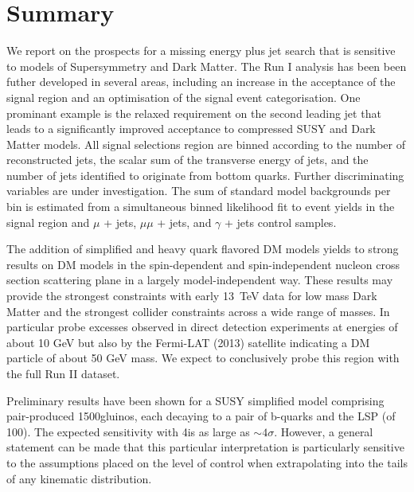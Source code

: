 \section{Summary}
\label{sec:summary}

We report on the prospects for a missing energy plus jet search that
is sensitive to models of Supersymmetry and Dark Matter. 
The Run I analysis has been been futher developed in several areas,
including an increase in the acceptance of the signal region and an
optimisation of the signal event categorisation. One prominant example
is the relaxed requirement on the second leading jet that leads to a
significantly improved acceptance to compressed SUSY and Dark Matter
models.
All signal selections region are binned according to the number of
reconstructed jets, the scalar sum of the transverse energy of jets,
and the number of jets identified to originate from bottom
quarks. Further discriminating variables are under investigation. The
sum of standard model backgrounds per bin is estimated from a
simultaneous binned likelihood fit to event yields in the signal
region and $\mu$ + jets, $\mu\mu$ + jets, and $\gamma$ + jets control
samples.

The addition of simplified and heavy quark flavored DM models yields
to strong results on DM models in the spin-dependent and
spin-independent nucleon cross section scattering plane in a largely
model-independent way. These results may provide the strongest
constraints with early 13~TeV data for low mass Dark Matter and the
strongest collider constraints across a wide range of masses. In
particular probe excesses observed in direct detection experiments at
energies of about 10 GeV but also by the Fermi-LAT (2013) satellite
indicating a DM particle of about 50 GeV mass. We expect to
conclusively probe this region with the full Run II dataset.

Preliminary results have been shown for a SUSY simplified model
comprising pair-produced 1500\gev gluinos, each decaying to a pair of
b-quarks and the LSP (of 100\gev). The expected sensitivity with
4\fbinv is as large as $\sim4\sigma$. However, a general statement can
be made that this particular interpretation is particularly sensitive
to the assumptions placed on the level of control when extrapolating
into the tails of any kinematic distribution.

